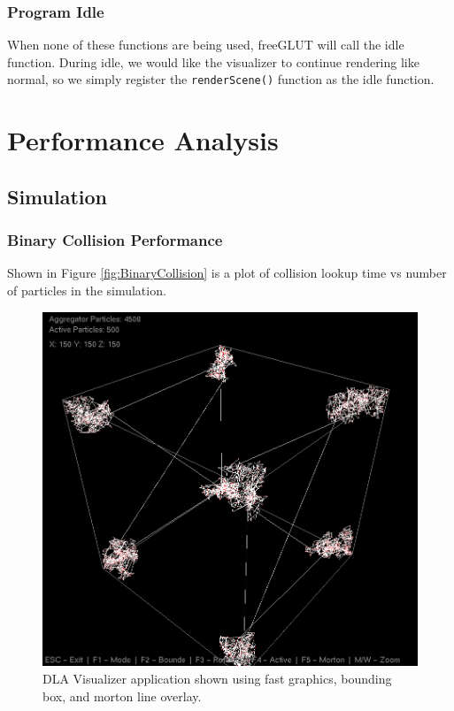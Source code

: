 \documentclass[fleqn,10pt]{UserGuideArx} %
\begin{document}
\subsubsection{Program Idle}
    When none of these functions are being used, freeGLUT will call the idle function. During idle, we would like the visualizer to continue rendering like normal, so we simply register the \texttt{renderScene()} function as the idle function.\\

\section{Performance Analysis}
\subsection{Simulation}
\subsubsection{Binary Collision Performance}
Shown in Figure \ref{fig:BinaryCollision} is a plot of collision lookup time vs number of particles in the simulation.
\begin{figure}[!ht]\centering %
    \includegraphics[width=\linewidth]{images/CornersMorton.png}
    \caption{DLA Visualizer application shown using fast graphics, bounding box, and morton line overlay.}
    \label{fig:CornersMorton}
\end{figure}
\end{document}
